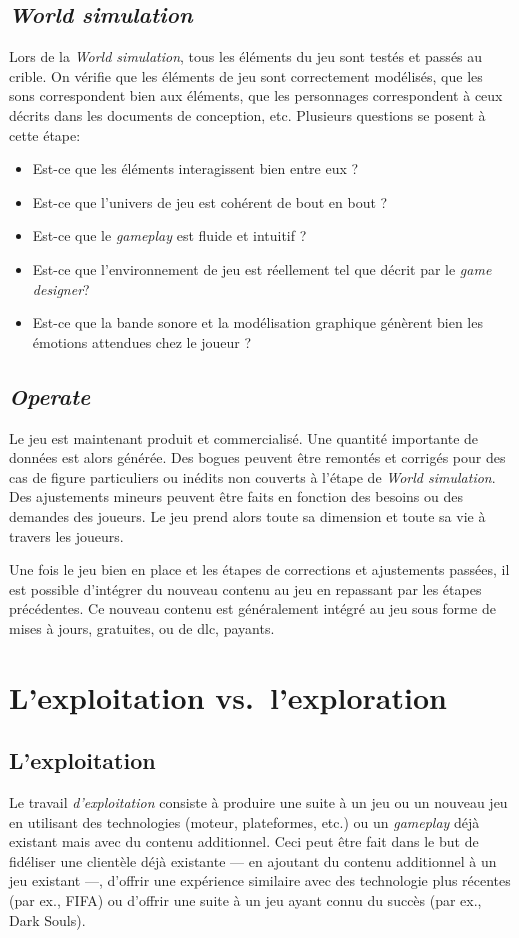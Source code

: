 \subsection{\emph{World simulation}}
Lors de la \emph{World simulation}, tous les éléments du jeu sont testés et passés au crible.
On vérifie que les éléments de jeu sont correctement modélisés, que les sons correspondent bien aux éléments, que les personnages correspondent à ceux décrits dans les documents de conception, etc.
Plusieurs questions se posent à cette \'etape:
\begin{itemize}
    \item Est-ce que les éléments interagissent bien entre eux ?
    \item Est-ce que l'univers de jeu est cohérent de bout en bout ?
    \item Est-ce que le \emph{gameplay} est fluide et intuitif ?
    \item Est-ce que l'environnement de jeu est réellement tel que décrit par le \emph{game designer}?
    \item Est-ce que la bande sonore et la modélisation graphique génèrent bien les émotions attendues chez le joueur ?
\end{itemize}


\subsection{\emph{Operate}}
Le jeu est maintenant produit et commercialisé.
Une quantité importante de données est alors générée.
Des bogues peuvent être remontés et corrigés pour des cas de figure particuliers ou inédits non couverts \`a l'étape de \emph{World simulation}.
Des ajustements mineurs peuvent être faits en fonction des besoins ou des demandes des joueurs.
Le jeu prend alors toute sa dimension et toute sa vie à travers les joueurs.

Une fois le jeu bien en place et les étapes de corrections et ajustements passées, il est possible d'intégrer du nouveau contenu au jeu en repassant par les étapes précédentes.
Ce nouveau contenu est généralement intégré au jeu sous forme de mises à jours, gratuites, ou de \gls{dlc}, payants.



\section{L'exploitation vs.\ l'exploration}
\subsection{L'exploitation}
Le travail \emph{d'exploitation} consiste à produire une suite à un jeu ou un nouveau jeu en utilisant des technologies (moteur, plateformes, etc.) ou un \emph{gameplay} déjà existant mais avec du contenu additionnel.
Ceci peut être fait dans le but de fidéliser une clientèle déjà existante --- en ajoutant du contenu additionnel à un jeu existant ---, d'offrir une expérience similaire avec des technologie plus récentes (par ex., FIFA) ou d'offrir une suite à un jeu ayant connu du succès (par ex., Dark Souls).

